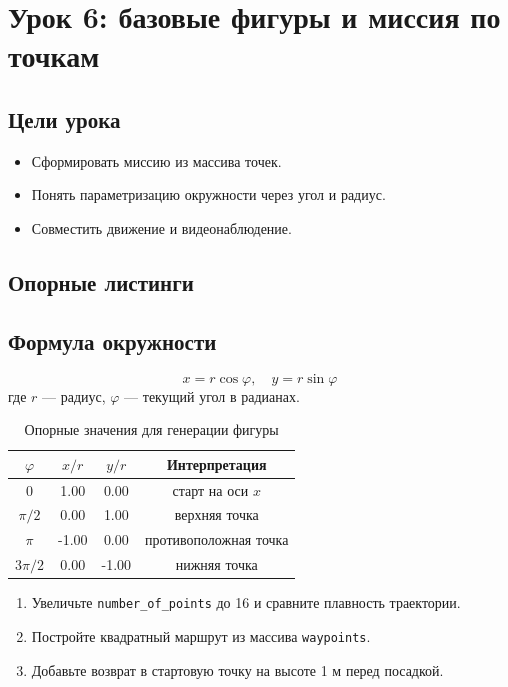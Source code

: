 \section{Урок 6: базовые фигуры и миссия по точкам}

\subsection{Цели урока}
\begin{itemize}
\item Сформировать миссию из массива точек.
\item Понять параметризацию окружности через угол и радиус.
\item Совместить движение и видеонаблюдение.
\end{itemize}

\subsection{Опорные листинги}



\subsection{Формула окружности}
\[
x = r\cos\varphi,\quad y = r\sin\varphi
\]
где $r$ — радиус, $\varphi$ — текущий угол в радианах.

\begin{table}[H]
\centering
\begin{tabular}{cccc}
\toprule
$\varphi$ & $x/r$ & $y/r$ & Интерпретация \\
\midrule
0 & 1.00 & 0.00 & старт на оси $x$ \\
$\pi/2$ & 0.00 & 1.00 & верхняя точка \\
$\pi$ & -1.00 & 0.00 & противоположная точка \\
$3\pi/2$ & 0.00 & -1.00 & нижняя точка \\
\bottomrule
\end{tabular}
\caption{Опорные значения для генерации фигуры}
\end{table}

\begin{taskbox}
\begin{enumerate}
\item Увеличьте \texttt{number\_of\_points} до 16 и сравните плавность траектории.
\item Постройте квадратный маршрут из массива \texttt{waypoints}.
\item Добавьте возврат в стартовую точку на высоте 1 м перед посадкой.
\end{enumerate}
\end{taskbox}

